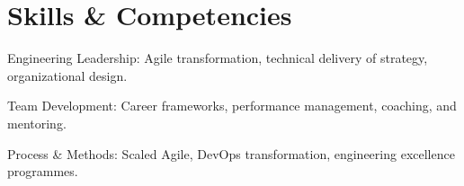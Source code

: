%
%
\section{Skills \& Competencies}
\location{}
\begin{tightemize}
    \item Engineering Leadership: Agile transformation, technical delivery of strategy, organizational design.
    \item Team Development: Career frameworks, performance management, coaching, and mentoring.
    \item Process \& Methods: Scaled Agile, DevOps transformation, engineering excellence programmes.
\end{tightemize}
\sectionsep{}
\vfill{}

